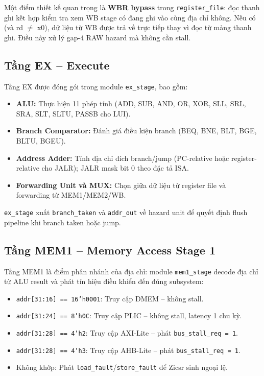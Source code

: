 Một điểm thiết kế quan trọng là \textbf{WBR bypass} trong \texttt{register\_file}: đọc thanh ghi kết hợp kiểm tra xem WB stage có đang ghi vào cùng địa chỉ không. Nếu có (và rd $\neq$ x0), dữ liệu từ WB được trả về trực tiếp thay vì đọc từ mảng thanh ghi. Điều này xử lý gap-4 RAW hazard mà không cần stall.

\subsection{Tầng EX -- Execute}

Tầng EX được đóng gói trong module \texttt{ex\_stage}, bao gồm:
\begin{itemize}
    \item \textbf{ALU:} Thực hiện 11 phép tính (ADD, SUB, AND, OR, XOR, SLL, SRL, SRA, SLT, SLTU, PASSB cho LUI).
    \item \textbf{Branch Comparator:} Đánh giá điều kiện branch (BEQ, BNE, BLT, BGE, BLTU, BGEU).
    \item \textbf{Address Adder:} Tính địa chỉ đích branch/jump (PC-relative hoặc register-relative cho JALR); JALR mask bit 0 theo đặc tả ISA.
    \item \textbf{Forwarding Unit và MUX:} Chọn giữa dữ liệu từ register file và forwarding từ MEM1/MEM2/WB.
\end{itemize}

\texttt{ex\_stage} xuất \texttt{branch\_taken} và \texttt{addr\_out} về hazard unit để quyết định flush pipeline khi branch taken hoặc jump.

\subsection{Tầng MEM1 -- Memory Access Stage 1}

Tầng MEM1 là điểm phân nhánh của địa chỉ: module \texttt{mem1\_stage} decode địa chỉ từ ALU result và phát tín hiệu điều khiển đến đúng subsystem:

\begin{itemize}
    \item \texttt{addr[31:16] == 16'h0001}: Truy cập DMEM -- không stall.
    \item \texttt{addr[31:24] == 8'h0C}: Truy cập PLIC -- không stall, latency 1 chu kỳ.
    \item \texttt{addr[31:28] == 4'h2}: Truy cập AXI-Lite -- phát \texttt{bus\_stall\_req = 1}.
    \item \texttt{addr[31:28] == 4'h3}: Truy cập AHB-Lite -- phát \texttt{bus\_stall\_req = 1}.
    \item Không khớp: Phát \texttt{load\_fault}/\texttt{store\_fault} để Zicsr sinh ngoại lệ.
\end{itemize}


